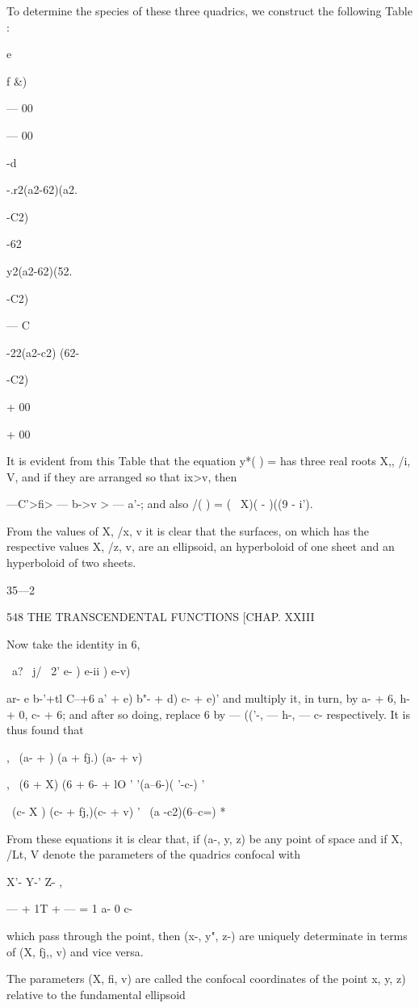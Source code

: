 {{To determine the species of these three quadrics, we construct the
following Table :

e

f \&)

— 00

— 00

-d

-.r2(a2-62)(a2.

-C2)

-62

y2(a2-62)(52.

-C2)

— C

-22(a2-c2) (62-

-C2)

+ 00

+ 00

It is evident from this Table that the equation y*( ) = has three real
roots X,, /i, V, and if they are arranged so that ix>v, then

 —C'>fi> — b->v > — a'-; and also /( ) = ( \ X)( - )((9 - i').

From the values of X, /x, v it is clear that the surfaces, on which
has the respective values X, /z, v, are an ellipsoid, an hyperboloid
of one sheet and an hyperboloid of two sheets.

35—2

548 THE TRANSCENDENTAL FUNCTIONS [CHAP. XXIII

Now take the identity in 6,

\ a? \ j/ \ 2' e- ) e-ii ) e-v)

ar- e b-'+tl C--+6 a' + e) b"- + d) c- + e)' and multiply it, in turn,
by a- + 6, h- + 0, c- + 6; and after so doing, replace 6 by — (('-, —
h-, — c- respectively. It is thus found that

, \ (a- + ) (a + fj.) (a- + v)

, \ (6 + X) (6 + 6- + lO ' '(a--6-)( '-c-) '

  \ (c- X ) (c- + fj,)(c- + v) '~ (a -c2)(6--c=) *

From these equations it is clear that, if (a-, y, z) be any point of
space and if X, /Lt, V denote the parameters of the quadrics confocal
with

X'- Y-' Z- ,

— + 1T + — = 1 a- 0 c-

which pass through the point, then (x-, y", z-) are uniquely
determinate in terms of (X, fj,, v) and vice versa.

The parameters (X, fi, v) are called the confocal coordinates of the
point x, y, z) relative to the fundamental ellipsoid

}}
